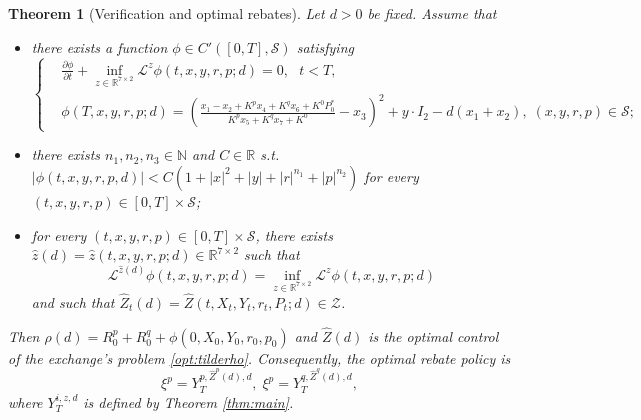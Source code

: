 \documentclass[12pt]{article}
\newtheorem{theorem}{Theorem}
\begin{document}
\begin{theorem}[Verification and optimal rebates]\label{thm:hjb}Let $d>0$ be fixed. Assume that
        \begin{itemize}
            \item there exists a function $\phi \in C'([0,T],\mathcal{S})  $ satisfying\\
            \begin{equation}
            \left\{
            \begin{aligned}
                &\frac{\partial \phi}{\partial t} + \inf_{z\in \mathbb R^{7\times 2}} \mathcal L^z\phi(t,x,y,r,p;d) = 0,\text{ }t<T, \\
                &\phi(T,x,y,r,p;d) = \left(\frac{x_1 - x_2 + K^p x_4 + K^q x_6 + K^0 P_0^*}{K^p x_5 + K^q x_7 + K^0} - x_3\right)^2 + y \cdot I_2 - d(x_1 + x_2),\; (x,y,r,p)\in \mathcal S;
            \end{aligned}
            \right.
            \label{eq:zsolution} 
            \end{equation}
            
            \item there exists $n_1,n_2, n_3 \in \mathbb{N}$ and $C \in \mathbb{R}$ s.t. $|\phi(t,x,y,r,p,d)| < C(1+ |x|^{2}+|y|+|r|^{n_1}+|p|^{n_2})$ for every  $(t,x,y,r,p) \in [0,T] \times\mathcal{S}$;
            \item for every $(t,x,y,r,p) \in [0,T] \times \mathcal{S} $, there exists $\hat z(d)=\hat{z}(t,x,y,r,p;d) \in \mathbb{R}^{7\times 2}$ such that 
            \[
            \mathcal L^{\hat z(d)}\phi(t,x,y,r,p;d) =  \inf_{z\in \mathbb R^{7\times 2}}\mathcal L^z\phi(t,x,y,r,p;d)\] and such that $\hat Z_t(d)=\hat{Z}(t,X_t,Y_t,r_t,P_t;d) \in \mathcal{Z}$.
        \end{itemize}
        Then $\rho(d) =R_0^p  +R_0^q+ \phi(0,X_0, Y_0, r_0,p_0)$ and $\hat Z(d)$ is the optimal control of the exchange's problem \eqref{opt:tilderho}. Consequently, the optimal rebate policy is 
        \[\xi^p=Y
        _T^{p,\hat Z^p(d),d},\; \xi^p=Y
        _T^{q,\hat Z^q(d),d}, \]
        where $Y _T^{i,z,d}$ is defined by Theorem \ref{thm:main}.
\end{theorem}
\end{document}
